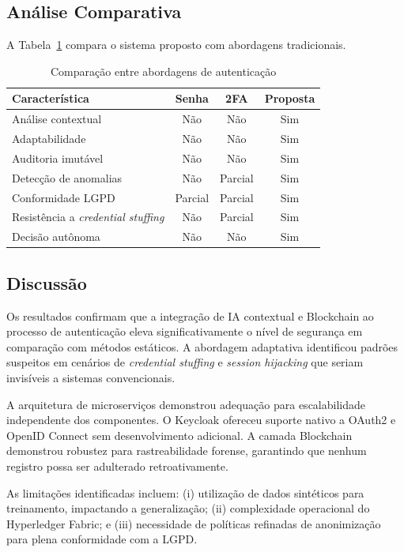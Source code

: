 \documentclass[12pt]{article}
\begin{document}
\subsection{Análise Comparativa}

A Tabela~\ref{tab:comparison} compara o sistema proposto com abordagens tradicionais.

\begin{table}[H]
\centering
\caption{Comparação entre abordagens de autenticação}
\label{tab:comparison}
\small
\begin{tabular}{@{}lccc@{}}
\toprule
\textbf{Característica} & \textbf{Senha} & \textbf{2FA} & \textbf{Proposta} \\
\midrule
Análise contextual       & Não & Não & Sim \\
Adaptabilidade           & Não & Não & Sim \\
Auditoria imutável       & Não & Não & Sim \\
Detecção de anomalias    & Não & Parcial & Sim \\
Conformidade LGPD        & Parcial & Parcial & Sim \\
Resistência a \textit{credential stuffing} & Não & Parcial & Sim \\
Decisão autônoma         & Não & Não & Sim \\
\bottomrule
\end{tabular}
\end{table}

\subsection{Discussão}

Os resultados confirmam que a integração de IA contextual e Blockchain ao processo de autenticação eleva significativamente o nível de segurança em comparação com métodos estáticos. A abordagem adaptativa identificou padrões suspeitos em cenários de \textit{credential stuffing} e \textit{session hijacking} que seriam invisíveis a sistemas convencionais.

A arquitetura de microserviços demonstrou adequação para escalabilidade independente dos componentes. O Keycloak ofereceu suporte nativo a OAuth2 e OpenID Connect sem desenvolvimento adicional. A camada Blockchain demonstrou robustez para rastreabilidade forense, garantindo que nenhum registro possa ser adulterado retroativamente.

As limitações identificadas incluem: (i) utilização de dados sintéticos para treinamento, impactando a generalização; (ii) complexidade operacional do Hyperledger Fabric; e (iii) necessidade de políticas refinadas de anonimização para plena conformidade com a LGPD.
\end{document}
